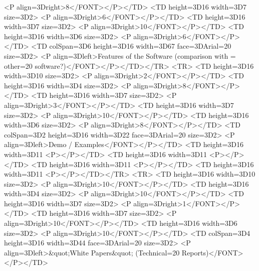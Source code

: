             <P align=3Dright>8</FONT></P></TD>
        <TD height=3D16 width=3D7%
size=3D2>
            <P align=3Dright>6</FONT></P></TD>
        <TD height=3D16 width=3D7%
size=3D2>
            <P align=3Dright>10</FONT></P></TD>
        <TD height=3D16 width=3D6%
size=3D2>
            <P align=3Dright>6</FONT></P></TD>
        <TD colSpan=3D6 height=3D16 width=3D67%
face=3DArial=20
            size=3D2>
            <P align=3Dleft>Features of the Software (comparison with =
other=20
            software?)</FONT></P></TD></TR>
    <TR>
        <TD height=3D16 width=3D10%
size=3D2>
            <P align=3Dright>2</FONT></P></TD>
        <TD height=3D16 width=3D4%
size=3D2>
            <P align=3Dright>8</FONT></P></TD>
        <TD height=3D16 width=3D7%
size=3D2>
            <P align=3Dright>3</FONT></P></TD>
        <TD height=3D16 width=3D7%
size=3D2>
            <P align=3Dright>10</FONT></P></TD>
        <TD height=3D16 width=3D6%
size=3D2>
            <P align=3Dright>8</FONT></P></TD>
        <TD colSpan=3D2 height=3D16 width=3D22%
face=3DArial=20
            size=3D2>
            <P align=3Dleft>Demo / Examples</FONT></P></TD>
        <TD height=3D16 width=3D11%
            <P></P></TD>
        <TD height=3D16 width=3D11%
            <P></P></TD>
        <TD height=3D16 width=3D11%
            <P></P></TD>
        <TD height=3D16 width=3D11%
            <P></P></TD></TR>
    <TR>
        <TD height=3D16 width=3D10%
size=3D2>
            <P align=3Dright>10</FONT></P></TD>
        <TD height=3D16 width=3D4%
size=3D2>
            <P align=3Dright>10</FONT></P></TD>
        <TD height=3D16 width=3D7%
size=3D2>
            <P align=3Dright>1</FONT></P></TD>
        <TD height=3D16 width=3D7%
size=3D2>
            <P align=3Dright>10</FONT></P></TD>
        <TD height=3D16 width=3D6%
size=3D2>
            <P align=3Dright>10</FONT></P></TD>
        <TD colSpan=3D4 height=3D16 width=3D44%
face=3DArial=20
            size=3D2>
            <P align=3Dleft>&quot;White Papers&quot; (Technical=20
            Reports)</FONT></P></TD>

